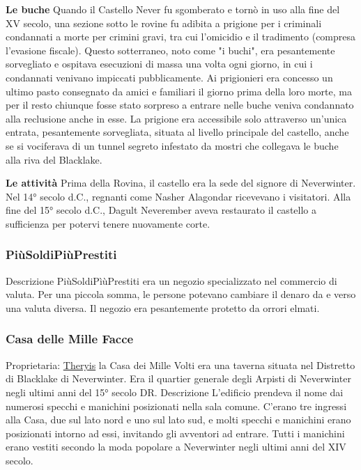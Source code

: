 \documentclass{article}
\begin{document}
\textbf{Le buche}
Quando il Castello Never fu sgomberato e tornò in uso alla fine del XV secolo, una sezione sotto le rovine fu adibita a prigione per i criminali condannati a morte per crimini gravi, tra cui l'omicidio e il tradimento (compresa l'evasione fiscale). Questo sotterraneo, noto come "i buchi", era pesantemente sorvegliato e ospitava esecuzioni di massa una volta ogni giorno, in cui i condannati venivano impiccati pubblicamente. Ai prigionieri era concesso un ultimo pasto consegnato da amici e familiari il giorno prima della loro morte, ma per il resto chiunque fosse stato sorpreso a entrare nelle buche veniva condannato alla reclusione anche in esse. La prigione era accessibile solo attraverso un'unica entrata, pesantemente sorvegliata, situata al livello principale del castello, anche se si vociferava di un tunnel segreto infestato da mostri che collegava le buche alla riva del Blacklake.


\textbf{Le attività}
Prima della Rovina, il castello era la sede del signore di Neverwinter. Nel 14° secolo d.C., regnanti come Nasher Alagondar ricevevano i visitatori. Alla fine del 15° secolo d.C., Dagult Neverember aveva restaurato il castello a sufficienza per potervi tenere nuovamente corte.

              \subsubsection{PiùSoldiPiùPrestiti}
Descrizione
PiùSoldiPìùPrestiti era un negozio specializzato nel commercio di valuta. Per una piccola somma, le persone potevano cambiare il denaro da e verso una valuta diversa. Il negozio era pesantemente protetto da orrori elmati.


              \subsubsection{Casa delle Mille Facce}
Proprietaria: \hyperlink{ther}{Theryis} \newline
la Casa dei Mille Volti era una taverna situata nel Distretto di Blacklake di Neverwinter. Era il quartier generale degli Arpisti di Neverwinter negli ultimi anni del 15° secolo DR.
Descrizione
L'edificio prendeva il nome dai numerosi specchi e manichini posizionati nella sala comune. C'erano tre ingressi alla Casa, due sul lato nord e uno sul lato sud, e molti specchi e manichini erano posizionati intorno ad essi, invitando gli avventori ad entrare. Tutti i manichini erano vestiti secondo la moda popolare a Neverwinter negli ultimi anni del XIV secolo.
\end{document}
